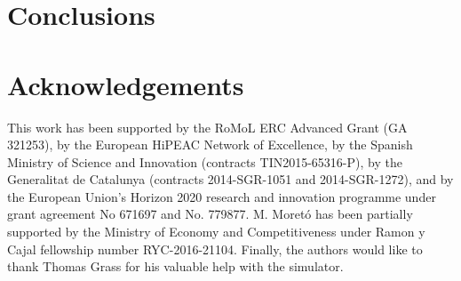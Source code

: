 \documentclass{llncs}
\begin{document}
\section{Conclusions}
\label{sec:conclusions}


\section*{Acknowledgements}
This work has been supported by the RoMoL ERC Advanced Grant (GA 321253), by the European HiPEAC Network of Excellence, by the Spanish Ministry of Science and Innovation (contracts TIN2015-65316-P), by the Generalitat de Catalunya (contracts 2014-SGR-1051 and 2014-SGR-1272), and by the European Union's Horizon 2020 research and innovation programme under grant agreement No 671697 and No. 779877.
M. Moret\'{o} has been partially supported by the Ministry of Economy and Competitiveness under Ramon y Cajal fellowship number RYC-2016-21104.
Finally, the authors would like to thank Thomas Grass for his valuable help with the simulator.







\end{document}
